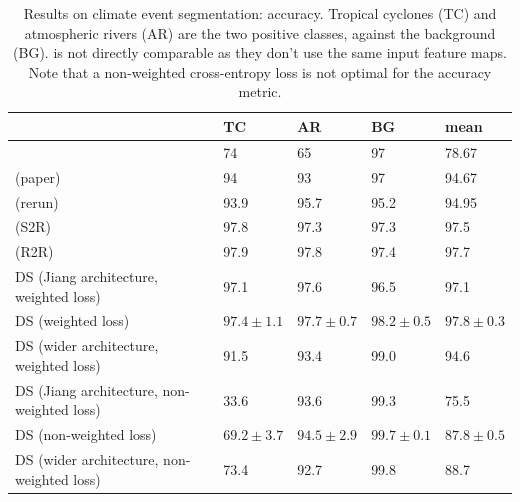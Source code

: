 \documentclass{article} %
\newcommand{\todo}[1]{{\color[rgb]{.6,.1,.6}{#1}}}
\begin{document}
\begin{table}
    \centering
	\begin{tabular}{l l l l l}
		\toprule
        & TC & AR & BG & mean \\
		\midrule
		\citet{mudigonda2017climateevents} & 74 & 65 & 97 & 78.67 \\
		\citet{jiang2019sphericalcnn} (paper) & 94 & 93 & 97 & 94.67 \\
		\citet{jiang2019sphericalcnn} (rerun) & 93.9 & 95.7 & 95.2 & 94.95 \\
        \citet{cohen2019gauge} (S2R) & 97.8 & 97.3 & 97.3 & 97.5 \\
        \citet{cohen2019gauge} (R2R) & 97.9 & 97.8 & 97.4 & 97.7 \\
		\midrule
		DS (Jiang architecture, weighted loss) & 97.1 & 97.6 & 96.5 & 97.1 \\
        DS (weighted loss) & $97.4\pm 1.1$ & $97.7\pm 0.7$ & $98.2\pm 0.5$ & $97.8\pm 0.3$ \\
		DS (wider architecture, weighted loss) & 91.5 & 93.4 & 99.0 & 94.6 \\
		\midrule
        DS (Jiang architecture, non-weighted loss) & 33.6 & 93.6 & 99.3 & 75.5 \\
        DS (non-weighted loss) & $69.2\pm 3.7$ & $94.5\pm 2.9$ & $99.7\pm 0.1$ & $87.8\pm 0.5$ \\
        DS (wider architecture, non-weighted loss) & 73.4 & 92.7 & 99.8 & 88.7 \\
		\bottomrule
    \end{tabular}
    \caption{
		Results on climate event segmentation: accuracy.
		Tropical cyclones (TC) and atmospheric rivers (AR) are the two positive classes, against the background (BG).
		\citet{mudigonda2017climateevents} is not directly comparable as they don't use the same input feature maps.
		Note that a non-weighted cross-entropy loss is not optimal for the accuracy metric.
		\label{tab:climate:accuracy}
	}
\end{table}
\end{document}

